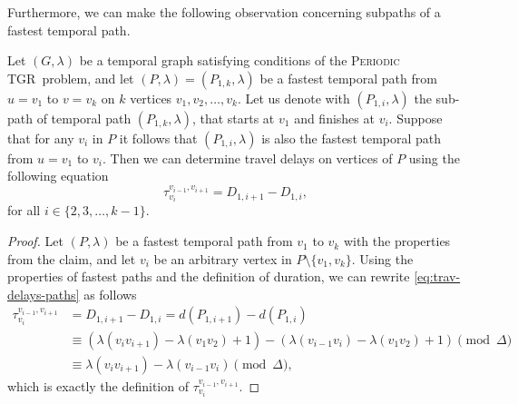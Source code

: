 \documentclass[a4paper,UKenglish,cleveref, autoref, thm-restate, anonymous]{lipics-v2021}
\newcommand{\deltaExact}{\textsc{Periodic TGR}}
\begin{document}
Furthermore, we can make the following observation concerning subpaths of a fastest temporal path.

\begin{lemma} \label{lemma:unique-fastest-path-allDelays}
    Let $(G, \lambda)$ be a temporal graph satisfying conditions of the \deltaExact\ problem,
    and let $(P,\lambda)=(P_{1,k},\lambda)$ be a fastest temporal path from $u=v_1$ to $v=v_k$ on $k$ vertices $v_1,v_2,\dots,v_k$.
    Let us denote with $(P_{1,i}, \lambda)$ the sub-path of temporal path $(P_{1,k},\lambda)$, that starts at $v_1$ and finishes at $v_i$.
    Suppose that for any $v_i$ in $P$ it follows that $(P_{1,i}, \lambda)$ is also the fastest temporal path from $u=v_1$ to $v_i$.
    Then we can determine travel delays on vertices of $P$ using the following equation
    \begin{equation}\label{eq:trav-delays-paths}
        \tau_{v_i}^{v_{i-1},v_{i+1}} = D_{1,i+1} - D_{1,i},
    \end{equation}
    for all $i \in \{2,3, \dots, k-1\}$.
\end{lemma}

\begin{proof}
    Let $(P,\lambda)$ be a fastest temporal path from $v_1$ to $v_k$ with the properties from the claim, and let $v_i$ be an arbitrary vertex in $P \setminus \{v_1,v_k\}$.
    Using the properties of fastest paths and the definition of duration, we can rewrite \cref{eq:trav-delays-paths} as follows
    \begin{align*}
        \tau_{v_i}^{v_{i-1},v_{i+1}} & = D_{1,i+1} - D_{1,i} =  d(P_{1,i+1}) - d(P_{1,i}) \\
        & \equiv 
        \left(\lambda(v_{i}v_{i+1}) - \lambda(v_1v_2) + 1\right) -  
        \left(\lambda(v_{i-1}v_{i}) - \lambda(v_1v_2) + 1\right) \pmod \Delta \\
        & \equiv \lambda(v_{i}v_{i+1}) - \lambda(v_{i-1}v_{i}) \pmod \Delta,
        \end{align*}
    which is exactly the definition of $\tau_{v_i}^{v_{i-1},v_{i+1}}$.
\end{proof}
\end{document}
